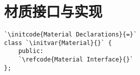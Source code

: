 \section{材质接口与实现}\label{sec:材质接口与实现}

\begin{lstlisting}
`\initcode{Material Declarations}{=}`
class `\initvar{Material}{}` {
    public:
    `\refcode{Material Interface}{}`
};
\end{lstlisting}